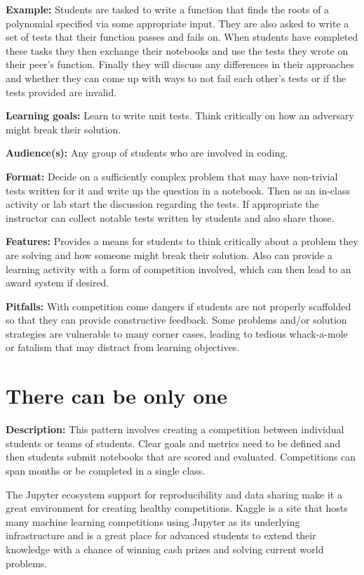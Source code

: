\documentclass[]{book}
\begin{document}
\textbf{Example:} Students are tasked to write a function that finds the
roots of a polynomial specified via some appropriate input. They are
also asked to write a set of tests that their function passes and fails
on. When students have completed these tasks they then exchange their
notebooks and use the tests they wrote on their peer's function. Finally
they will discuss any differences in their approaches and whether they
can come up with ways to not fail each other's tests or if the tests
provided are invalid.

\textbf{Learning goals:} Learn to write unit tests. Think critically on
how an adversary might break their solution.

\textbf{Audience(s):} Any group of students who are involved in coding.

\textbf{Format:} Decide on a sufficiently complex problem that may have
non-trivial tests written for it and write up the question in a
notebook. Then as an in-class activity or lab start the discussion
regarding the tests. If appropriate the instructor can collect notable
tests written by students and also share those.

\textbf{Features:} Provides a means for students to think critically
about a problem they are solving and how someone might break their
solution. Also can provide a learning activity with a form of
competition involved, which can then lead to an award system if desired.

\textbf{Pitfalls:} With competition come dangers if students are not
properly scaffolded so that they can provide constructive feedback. Some
problems and/or solution strategies are vulnerable to many corner cases,
leading to tedious whack-a-mole or fatalism that may distract from
learning objectives.

\section{There can be only one}\label{there-can-be-only-one}

\textbf{Description:} This pattern involves creating a competition
between individual students or teams of students. Clear goals and
metrics need to be defined and then students submit notebooks that are
scored and evaluated. Competitions can span months or be completed in a
single class.

The Jupyter ecosystem support for reproducibility and data sharing make
it a great environment for creating healthy competitions. Kaggle is a
site that hosts many machine learning competitions using Jupyter as its
underlying infrastructure and is a great place for advanced students to
extend their knowledge with a chance of winning cash prizes and solving
current world problems.
\end{document}

